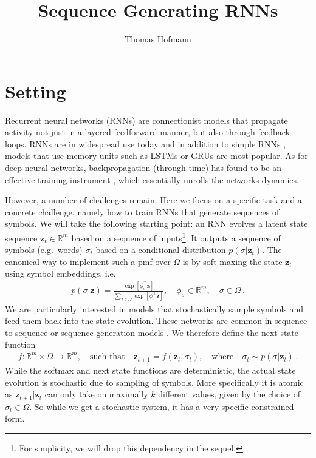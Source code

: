 \documentclass{article}
\title{Sequence Generating RNNs}
\author{Thomas Hofmann}
\newcommand{\up}[1]{_{#1}}
\newcommand{\z}{{\mathbf z}}
\renewcommand{\Re}{{\mathbb R}}
\begin{document}
\maketitle

\section{Setting} 

Recurrent neural networks (RNNs) are connectionist models that propagate activity not just in a layered feedforward manner, but also through feedback loops. RNNs are in widespread use today and in addition to simple RNNs \cite{elman1990finding}, models that use memory units such as LSTMs \cite{hochreiter1997long} or GRUs \cite{chung2015gated} are most popular. As for deep neural networks, backpropagation (through time) has found to be an effective training instrument \cite{werbos1990backpropagation}, which essentially unrolls the networks dynamics. 


However, a number of challenges remain. Here we focus on a specific task and a concrete challenge, namely how to train RNNs that generate sequences of symbols.  We will take the following starting point: an RNN evolves a latent state sequence $\z_t \in \Re^m$ based on a sequence of inputs\footnote{For simplicity, we will drop this dependency in the sequel.}. It outputs a sequence of symbols (e.g.~words) $\sigma \up t$ based on a conditional distribution $p(\sigma | \z_t)$. The canonical way to implement such a pmf over $\Omega$ is by soft-maxing the state $\z_t$ using symbol embeddings, i.e.
\begin{align}
p(\sigma | \z) = \frac{\exp[ \phi_\sigma^\top \z]}{\sum_{\tau \in \Omega} \exp[ \phi_{\tau}^\top \z]}, \quad \phi_\sigma \in \Re^m, \quad \sigma \in \Omega\,.
\end{align}
We are particularly interested in models that stochastically sample symbols  and feed them back into the state evolution. These networks \cite{jordan1997serial} are common in sequence-to-sequence or sequence generation models \cite{sutskever2014sequence}. We therefore define the next-state function 
\begin{align}
f: \Re^m \times \Omega \to \Re^m, \quad \text{such that} \quad \z\up {t+1} = f(\z\up t, \sigma\up t), \quad \text{where} \quad \sigma \up t \sim p(\sigma | \z_t)\,.
\end{align}
While the softmax and next state functions are deterministic, the actual state evolution is stochastic due to sampling of symbols. More specifically it is atomic as $\z \up{t+1} | \z\up t$ can only take on maximally $k$ different values, given by the choice of $\sigma \up t \in \Omega$. So while we get a stochastic system, it has a very specific constrained form. 
\end{document}
